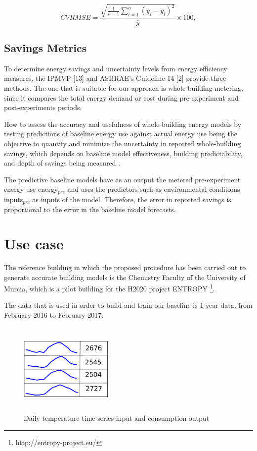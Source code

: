 \documentclass[10pt, conference, compsocconf]{IEEEtran}
\begin{document}
\[
 CVRMSE = \frac{\sqrt{\frac{1}{n-1}\sum_{i=1}^{n}(y_i-\bar{y_i})^2}}{\bar{y}} \times 100,
\]


\subsection{Savings Metrics}

To determine energy savings and uncertainty levels from energy efficiency measures, the IPMVP [13] and ASHRAE’s Guideline 14 [2] provide three methods. The one that is suitable for our approach is whole-building metering, since it compares the total energy demand or cost during pre-experiment and post-experiments periods.

How to assess the accuracy and usefulness of whole-building energy models by testing predictions of baseline energy use against actual energy use being the objective to quantify and minimize the uncertainty in reported whole-building savings, which depends
on baseline model effectiveness, building predictability, and depth of savings being measured \cite{kramer2013energy}.

The predictive baseline models have as an output the metered pre-experiment energy use energy$_{pre}$ and uses the predictors such as environmental conditions inputs$_{pre}$ as inputs of the model. Therefore, the error in reported savings is proportional to the error in the baseline model forecasts.


\section{Use case}

The reference building in which the proposed procedure has been carried out to generate accurate building models is the Chemistry Faculty of the University of Murcia, which is a pilot building for the H2020 project ENTROPY \footnote{http://entropy-project.eu/}.  

The data that is used in order to build and train our baseline is 1 year data, from February 2016 to February 2017. 

\begin{figure}[h]%
\centering
\centerline{\includegraphics[width=4.5cm,height=4.5cm,keepaspectratio]{./pics/table_inputs_outputs.pdf}}
\caption{Daily temperature time series input and consumption output}\vspace*{-6pt}
  \label{fig:inout}
\end{figure}
\end{document}
